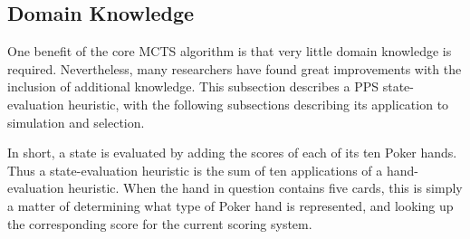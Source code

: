 \documentclass[letterpaper]{article}
\begin{document}
%
%
%
%
%
%

\subsection{Domain Knowledge}

One benefit of the core MCTS algorithm is that very little domain knowledge is required. Nevertheless, many researchers have found great improvements with the inclusion of additional knowledge. This subsection describes a PPS state-evaluation heuristic, with the following subsections describing its application to simulation and selection.

In short, a state is evaluated by adding the scores of each of its ten Poker hands. Thus a state-evaluation heuristic is the sum of ten applications of a hand-evaluation heuristic. When the hand in question contains five cards, this is simply a matter of determining what type of Poker hand is represented, and looking up the corresponding score for the current scoring system.
\end{document}
